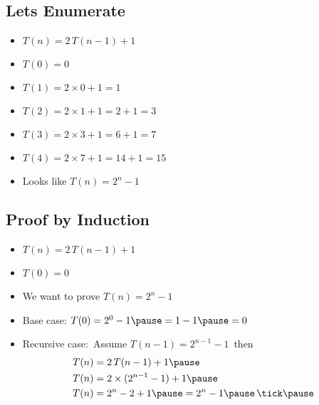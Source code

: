
\begin{slide}
\section{Lets Enumerate}

\begin{itemize}\squeeze
\item $T(n) = 2\,T(n-1) + 1$\pause
\item $T(0) = 0$\pause
\item $T(1) = 2\times0 + 1 = 1$\pause
\item $T(2) = 2\times1 + 1 = 2+1 = 3$\pause
\item $T(3) = 2\times3 + 1 = 6+1 = 7$\pause
\item $T(4) = 2\times7 + 1 = 14+1 = 15$\pause
\item Looks like $T(n) = 2^n-1$\pause
\end{itemize}
\end{slide}


\begin{slide}
\section{Proof by Induction}

\begin{itemize}
\item $T(n) = 2\,T(n-1) + 1$
\item $T(0) = 0$\pause
\item We want to prove $T(n) = 2^n-1$\pause
\item Base case: $T(0) = 2^0-1\pause=1-1\pause=0$\pause\,\tick\pause
\item Recursive case:\pause\ Assume $T(n-1) = 2^{n-1}-1$\pause\ then
  \begin{align*}
    T(n) &= 2\,T(n-1) + 1\pause\\
    T(n) &= 2\times(2^{n-1}-1) + 1\pause\\
    T(n) &= 2^n - 2 + 1 \pause = 2^n - 1\pause\,\mbox{\tick}\pause
  \end{align*}
\end{itemize}
\end{slide}


